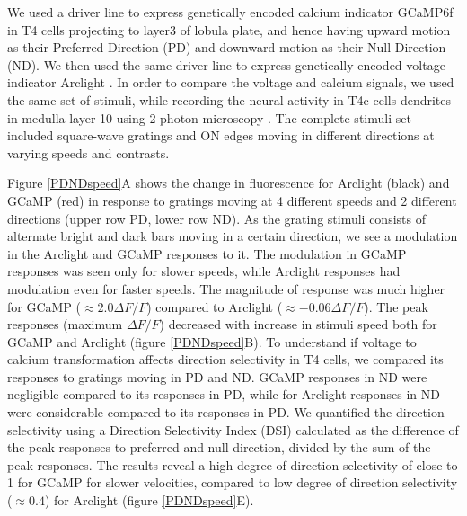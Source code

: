 \documentclass[9pt,lineno]{elife}
\begin{document}
We used a driver line to express genetically encoded calcium indicator GCaMP6f \parencite{Chen2013} in T4 cells projecting to layer3 of lobula plate, and hence having upward motion as their Preferred Direction (PD) and downward motion as their Null Direction (ND). We then used the same driver line to express genetically encoded voltage indicator Arclight \parencite{Jin2012}. %
In order to compare the voltage and calcium signals, we used the same set of stimuli, while recording the neural activity in T4c cells dendrites in medulla layer 10 using 2-photon microscopy \parencite{Denk1990}. The complete stimuli set included square-wave gratings and ON edges moving in different directions at varying speeds and contrasts.

Figure \ref{PDNDspeed}A shows the change in fluorescence for Arclight (black) and GCaMP (red) in response to gratings moving at 4 different speeds and 2 different directions (upper row PD, lower row ND). As the grating stimuli consists of alternate bright and dark bars moving in a certain direction, we see a modulation in the Arclight and GCaMP responses to it. The modulation in GCaMP responses was seen only for slower speeds, while Arclight responses had modulation even for faster speeds. The magnitude of response was much higher for GCaMP ($\approx2.0 \Delta F/F$) compared to Arclight ($\approx -0.06 \Delta F/F$). The peak responses (maximum $\Delta F/F$) decreased with increase in stimuli speed both for GCaMP and Arclight (figure \ref{PDNDspeed}B). To understand if voltage to calcium transformation affects direction selectivity in T4 cells, we compared its responses to gratings moving in PD and ND. GCaMP responses in ND were negligible compared to its responses in PD, while for Arclight responses in ND were considerable compared to its responses in PD. We quantified the direction selectivity using a Direction Selectivity Index (DSI) calculated as the difference of the peak responses to preferred and null direction, divided by the sum of the peak responses. The results reveal a high degree of direction selectivity of close to 1 for GCaMP for slower velocities, compared to low degree of direction selectivity ($\approx0.4$) for Arclight (figure \ref{PDNDspeed}E).
\end{document}
